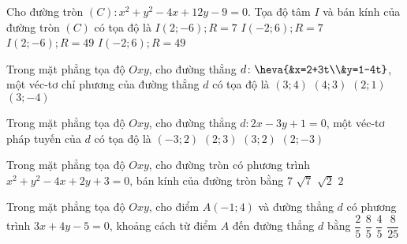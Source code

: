 	\begin{ex}%
		Cho đường tròn $(C)\colon  x^2+y^2-4x+12y-9=0$. Tọa độ tâm $I$ và bán kính của đường tròn $(C)$ có tọa độ là
		\choice
		{\True $I(2 ;  -6) ;   R=7$}
		{$I(-2 ;   6) ;   R=7$}
		{$I(2 ;  -6) ;   R=49$}
		{$I(-2 ;   6) ;   R=49$}
	\end{ex}
	
	\begin{ex}%
		Trong mặt phẳng tọa độ $Oxy$, cho đường thẳng $d\colon \heva{&x=2+3t\\&y=1-4t}$, một véc-tơ chỉ phương của đường thẳng $d$ có tọa độ là
		\choice
		{$(3;4)$}
		{$(4;3)$}
		{$(2;1)$}
		{\True $(3;-4)$}
	\end{ex}
	\begin{ex}%
		Trong mặt phẳng tọa độ $Oxy$, cho đường thẳng $d\colon 2x-3y+1=0$, một véc-tơ pháp tuyến của $d$ có tọa độ là
		\choice
		{$(-3;2)$}
		{$(2;3)$}
		{$(3;2)$}
		{\True $(2;-3)$}
	\end{ex}
	\begin{ex}%
		Trong mặt phẳng tọa độ $Oxy$, cho đường tròn có phương trình $x^2+y^2-4x+2y+3=0$, bán kính của đường tròn bằng
		\choice
		{$7$}
		{$\sqrt{7}$}
		{\True $\sqrt{2}$}
		{$2$}
	\end{ex}
	\begin{ex}%
		Trong mặt phẳng tọa độ $Oxy$, cho điểm $A(-1;4)$ và đường thẳng $d$ có phương trình $3x+4y-5=0$, khoảng cách từ điểm $A$ đến đường thẳng $d$ bằng
		\choice
		{$\dfrac{2}{5}$}
		{\True $\dfrac{8}{5}$}
		{$\dfrac{4}{5}$}
		{$\dfrac{8}{25}$}
	\end{ex}
	

